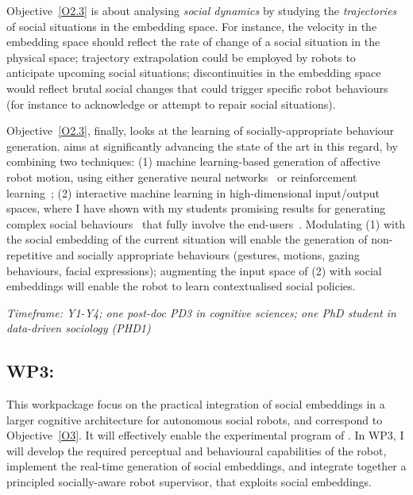 Objective~\ref{O2.3} is about analysing \emph{social dynamics} by
studying the \emph{trajectories} of social situations in the embedding space.
For instance, the velocity in the embedding space should reflect the rate of
change of a social situation in the physical space; trajectory extrapolation
could be employed by robots to anticipate upcoming social situations;
discontinuities in the embedding space would reflect brutal social changes that
could trigger specific robot behaviours (for instance to acknowledge or attempt
to repair social situations).

Objective~\ref{O2.3}, finally, looks at the learning of socially-appropriate
behaviour generation. \project aims at significantly advancing the state of the
art in this regard, by combining two techniques: (1) machine learning-based
generation of affective robot motion, using either generative neural
networks~\cite{marmpena2019generating,suguitan2020moveae} or reinforcement
learning~; (2) interactive machine learning in high-dimensional
input/output spaces, where I have shown with my students promising results for
generating complex social behaviours~\cite{senft2019teaching, winkle2020couch}
that fully involve the end-users~\cite{winkle2018social}. Modulating (1) with
the social embedding of the current situation will enable the generation of
non-repetitive and socially appropriate behaviours (gestures, motions, gazing
behaviours, facial expressions); augmenting the input space of (2) with social
embeddings will enable the robot to learn contextualised social policies.


\vspace{1em}
\noindent\emph{Timeframe: Y1-Y4; one post-doc PD3 in cognitive sciences; one PhD
student in data-driven sociology (PHD1)}

\subsection{WP3: \textbf{\WPC}}

This workpackage focus on the practical integration of social embeddings in a
larger cognitive architecture for autonomous social robots, and correspond to
Objective~\ref{O3}. It will effectively enable the experimental program of
\project.  In WP3, I will develop the required perceptual and behavioural
capabilities of the robot, implement the real-time generation of social
embeddings, and integrate together a principled socially-aware robot supervisor,
that exploits social embeddings.


